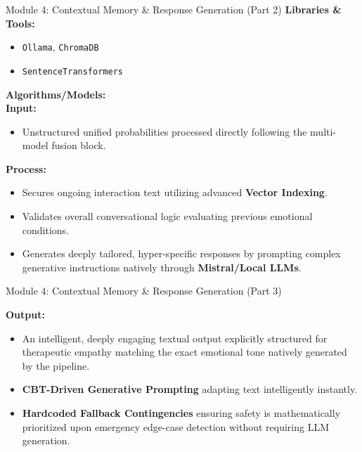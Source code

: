 \documentclass[11pt]{beamer}
\begin{document}
\begin{frame}{Module 4: Contextual Memory \& Response Generation (Part 2)}
\textbf{Libraries \& Tools:}
\begin{itemize}
    \item \texttt{Ollama}, \texttt{ChromaDB}
    \item \texttt{SentenceTransformers}
\end{itemize}

\vspace{0.3cm}
\textbf{Algorithms/Models:} \\
\textbf{Input:}
\begin{itemize}
    \item Unstructured unified probabilities processed directly following the multi-model fusion block.
\end{itemize}

\textbf{Process:}
\begin{itemize}
    \item Secures ongoing interaction text utilizing advanced \textbf{Vector Indexing}.
    \item Validates overall conversational logic evaluating previous emotional conditions.
    \item Generates deeply tailored, hyper-specific responses by prompting complex generative instructions natively through \textbf{Mistral/Local LLMs}.
\end{itemize}

\end{frame}
\begin{frame}{Module 4: Contextual Memory \& Response Generation (Part 3)}

\textbf{Output:}
\begin{itemize}
    \item An intelligent, deeply engaging textual output explicitly structured for therapeutic empathy matching the exact emotional tone natively generated by the pipeline.
\end{itemize}
\begin{itemize}
    \item \textbf{CBT-Driven Generative Prompting} adapting text intelligently instantly.
    \item \textbf{Hardcoded Fallback Contingencies} ensuring safety is mathematically prioritized upon emergency edge-case detection without requiring LLM generation.
\end{itemize}
\end{frame}
\end{document}
